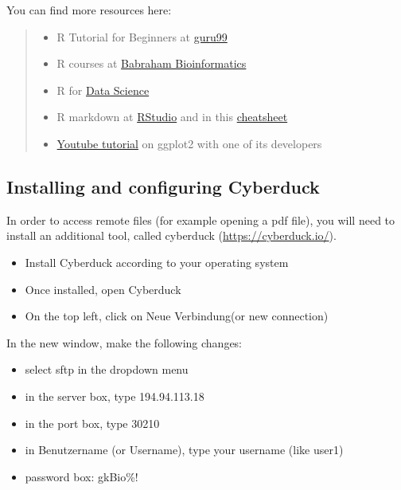 \documentclass[
]{book}
\providecommand{\tightlist}{%
  \setlength{\itemsep}{0pt}\setlength{\parskip}{0pt}}
\begin{document}
You can find more resources here:

\begin{quote}
\begin{itemize}
\tightlist
\item
  R Tutorial for Beginners at \href{https://www.guru99.com/r-tutorial.html}{guru99}
\item
  R courses at \href{https://www.bioinformatics.babraham.ac.uk/training.html\#advancedrtidy}{Babraham Bioinformatics}
\item
  R for \href{https://r4ds.had.co.nz}{Data Science}
\item
  R markdown at \href{https://rmarkdown.rstudio.com/lesson-1.html}{RStudio} and in this \href{https://www.markdownguide.org/cheat-sheet/}{cheatsheet}
\item
  \href{https://www.youtube.com/watch?v=h29g21z0a68}{Youtube tutorial} on ggplot2 with one of its developers
\end{itemize}
\end{quote}

\hypertarget{installing-and-configuring-cyberduck}{%
\subsection*{Installing and configuring Cyberduck}\label{installing-and-configuring-cyberduck}}

In order to access remote files (for example opening a pdf file), you will need to install an additional tool, called cyberduck (\url{https://cyberduck.io/}).

\begin{itemize}
\tightlist
\item
  Install Cyberduck according to your operating system
\item
  Once installed, open Cyberduck
\item
  On the top left, click on Neue Verbindung(or new connection)
\end{itemize}

In the new window, make the following changes:

\begin{itemize}
\tightlist
\item
  select sftp in the dropdown menu
\item
  in the server box, type 194.94.113.18
\item
  in the port box, type 30210
\item
  in Benutzername (or Username), type your username (like user1)
\item
  password box: gkBio\%!
\end{itemize}
\end{document}
